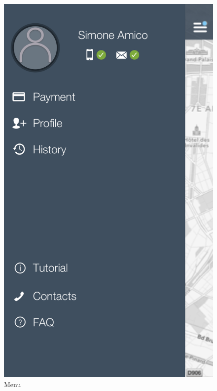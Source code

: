 \documentclass[12pt]{article}
\begin{document}
\begin{figure}
 	 	  \includegraphics[scale=0.25]{Images/mobileApp/Menu.png}
		  \caption{Menu}
		  \endminipage
 	 	\end{figure}
 	 	\clearpage
 	 	\FloatBarrier
\end{document}
